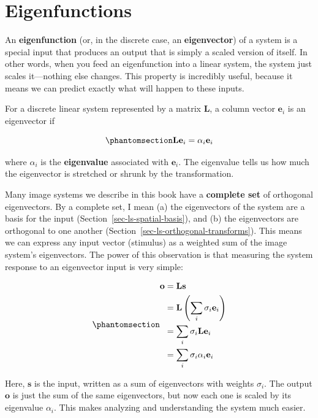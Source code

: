 \documentclass[
  letterpaper,
]{book}
\begin{document}
\section{Eigenfunctions}\label{sec-ls-eigenfunctions}

An \textbf{eigenfunction} (or, in the discrete case, an
\textbf{eigenvector}) of a system is a special input that produces an
output that is simply a scaled version of itself. In other words, when
you feed an eigenfunction into a linear system, the system just scales
it---nothing else changes. This property is incredibly useful, because
it means we can predict exactly what will happen to these inputs.

For a discrete linear system represented by a matrix \(\mathbf{L}\), a
column vector \(\mathbf{e}_i\) is an eigenvector if

\begin{equation}\phantomsection\label{eq-eigenfunction-definition}{
\mathbf{L} \mathbf{e}_i = \alpha_i \mathbf{e}_i
}\end{equation}

where \(\alpha_i\) is the \textbf{eigenvalue} associated with
\(\mathbf{e}_i\). The eigenvalue tells us how much the eigenvector is
stretched or shrunk by the transformation.

Many image systems we describe in this book have a \textbf{complete set}
of orthogonal eigenvectors. By a complete set, I mean (a) the
eigenvectors of the system are a basis for the input
(Section~\ref{sec-ls-spatial-basis}), and (b) the eigenvectors are
orthogonal to one another (Section~\ref{sec-ls-orthogonal-transforms}).
This means we can express any input vector (stimulus) as a weighted sum
of the image system's eigenvectors. The power of this observation is
that measuring the system response to an eigenvector input is very
simple:

\begin{equation}\phantomsection\label{eq-linear-eigencalculations}{
\begin{aligned}
\mathbf{o} & = \mathbf{L} \mathbf{s} \\
       & = \mathbf{L} \left(\sum_i \sigma_i \mathbf{e}_i \right) \\
       & = \sum_i \sigma_i \mathbf{L} \mathbf{e}_i \\
       & = \sum_i \sigma_i \alpha_i \mathbf{e}_i
\end{aligned}
}\end{equation}

Here, \(\mathbf{s}\) is the input, written as a sum of eigenvectors with
weights \(\sigma_i\). The output \(\mathbf{o}\) is just the sum of the
same eigenvectors, but now each one is scaled by its eigenvalue
\(\alpha_i\). This makes analyzing and understanding the system much
easier.
\end{document}
